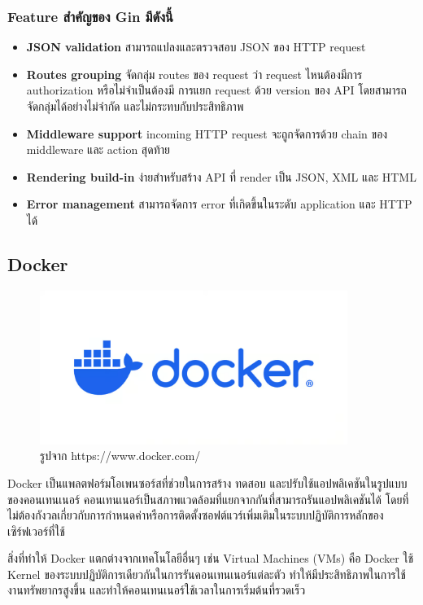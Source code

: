 \subsubsection{Feature สำคัญของ Gin มีดังนี้ }
\begin{itemize}
  \item \textbf{JSON validation} สามารถแปลงและตรวจสอบ JSON ของ HTTP request
  \item \textbf{Routes grouping} จัดกลุ่ม routes ของ request ว่า request ไหนต้องมีการ authorization หรือไม่จำเป็นต้องมี การแยก request ด้วย version ของ API โดยสามารถจัดกลุ่มได้อย่างไม่จำกัด และไม่กระทบกับประสิทธิภาพ
  \item \textbf{Middleware support} incoming HTTP request จะถูกจัดการด้วย chain ของ middleware และ action สุดท้าย
  \item \textbf{Rendering build-in} ง่ายสำหรับสร้าง API ที่ render เป็น JSON, XML และ HTML
  \item \textbf{Error management} สามารถจัดการ error ที่เกิดขึ้นในระดับ application และ HTTP ได้
\end{itemize}

\subsection{Docker}
\begin{figure}[H]
  \centering
  \includegraphics[width=100mm, keepaspectratio ]{pictures/docker.png}
  \caption[Poem]{รูปจาก https://www.docker.com/}
  \label{fig:docker}
\end{figure}

\hspace{1.27cm}Docker เป็นแพลตฟอร์มโอเพนซอร์สที่ช่วยในการสร้าง ทดสอบ และปรับใช้แอปพลิเคชันในรูปแบบของคอนเทนเนอร์ คอนเทนเนอร์เป็นสภาพแวดล้อมที่แยกจากกันที่สามารถรันแอปพลิเคชันได้ โดยที่ไม่ต้องกังวลเกี่ยวกับการกำหนดค่าหรือการติดตั้งซอฟต์แวร์เพิ่มเติมในระบบปฏิบัติการหลักของเซิร์ฟเวอร์ที่ใช้

\hspace{0.8cm}สิ่งที่ทำให้ Docker แตกต่างจากเทคโนโลยีอื่นๆ เช่น Virtual Machines (VMs) คือ Docker ใช้ Kernel ของระบบปฏิบัติการเดียวกันในการรันคอนเทนเนอร์แต่ละตัว ทำให้มีประสิทธิภาพในการใช้งานทรัพยากรสูงขึ้น และทำให้คอนเทนเนอร์ใช้เวลาในการเริ่มต้นที่รวดเร็ว

